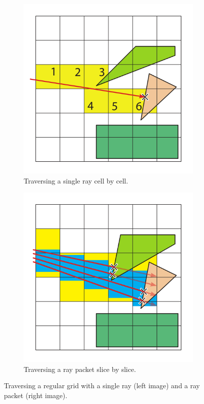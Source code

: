 \begin{figure}
	\centering
	\begin{subfigure}[t]{0.44\textwidth}
		\centering
		\includegraphics[width=\textwidth]{images/cell_traverser}
		\caption{
			Traversing a single ray cell by cell.
		}
		\label{fig:cell_traverser}
	\end{subfigure}
	\begin{subfigure}[t]{0.44\textwidth}
		\centering
		\includegraphics[width=\textwidth]{images/slice_traverser}
		\caption{
			Traversing a ray packet slice by slice.
		}
		\label{fig:slice_traverser}
	\end{subfigure}
	\caption{
		Traversing a regular grid with a single ray (left image) and a ray packet (right image).
	}
	\label{fig:traverser}
\end{figure}

